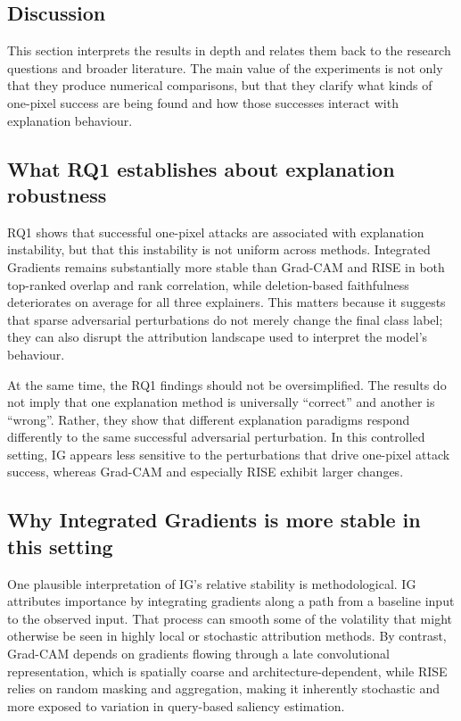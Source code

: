 \subsection{Discussion}
\label{sec:discussion}

This section interprets the results in depth and relates them back to the research questions and broader literature.
The main value of the experiments is not only that they produce numerical comparisons, but that they clarify what kinds of one-pixel success are being found and how those successes interact with explanation behaviour.

\subsection{What RQ1 establishes about explanation robustness}
RQ1 shows that successful one-pixel attacks are associated with explanation instability, but that this instability is not uniform across methods.
Integrated Gradients remains substantially more stable than Grad-CAM and RISE in both top-ranked overlap and rank correlation, while deletion-based faithfulness deteriorates on average for all three explainers.
This matters because it suggests that sparse adversarial perturbations do not merely change the final class label; they can also disrupt the attribution landscape used to interpret the model's behaviour.

At the same time, the RQ1 findings should not be oversimplified.
The results do not imply that one explanation method is universally ``correct'' and another is ``wrong''.
Rather, they show that different explanation paradigms respond differently to the same successful adversarial perturbation.
In this controlled setting, IG appears less sensitive to the perturbations that drive one-pixel attack success, whereas Grad-CAM and especially RISE exhibit larger changes.

\subsection{Why Integrated Gradients is more stable in this setting}
One plausible interpretation of IG's relative stability is methodological.
IG attributes importance by integrating gradients along a path from a baseline input to the observed input.
That process can smooth some of the volatility that might otherwise be seen in highly local or stochastic attribution methods.
By contrast, Grad-CAM depends on gradients flowing through a late convolutional representation, which is spatially coarse and architecture-dependent, while RISE relies on random masking and aggregation, making it inherently stochastic and more exposed to variation in query-based saliency estimation.

